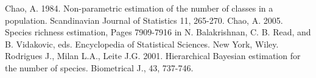 \documentclass{amsart}
\begin{document}
\begin{thebibliography}{99}
 Chao, A. 1984. Non-parametric estimation of the number of classes in a population. Scandinavian Journal of Statistics 11, 265-270.
 Chao, A. 2005. Species richness estimation, Pages 7909-7916 in N. Balakrishnan, C. B. Read, and B. Vidakovic, eds. Encyclopedia of Statistical Sciences. New York, Wiley.
Rodrigues J., Milan L.A., Leite J.G. 2001.  Hierarchical Bayesian estimation for the 
number of species. Biometrical J., 43, 737-746.

\end{thebibliography}
\end{document}
